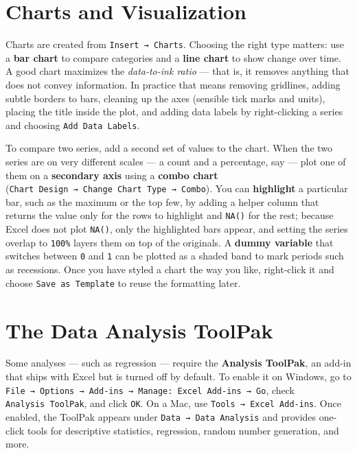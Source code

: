 \documentclass[
  11pt,
  letterpaper,
  DIV=11,
  numbers=noendperiod,
  oneside,
  open=any]{scrreprt}
\begin{document}
\section{Charts and Visualization}\label{charts-and-visualization}

Charts are created from \texttt{Insert\ →\ Charts}. Choosing the right
type matters: use a \textbf{bar chart} to compare categories and a
\textbf{line chart} to show change over time. A good chart maximizes the
\emph{data-to-ink ratio} --- that is, it removes anything that does not
convey information. In practice that means removing gridlines, adding
subtle borders to bars, cleaning up the axes (sensible tick marks and
units), placing the title inside the plot, and adding data labels by
right-clicking a series and choosing \texttt{Add\ Data\ Labels}.

To compare two series, add a second set of values to the chart. When the
two series are on very different scales --- a count and a percentage,
say --- plot one of them on a \textbf{secondary axis} using a
\textbf{combo chart}
(\texttt{Chart\ Design\ →\ Change\ Chart\ Type\ →\ Combo}). You can
\textbf{highlight} a particular bar, such as the maximum or the top few,
by adding a helper column that returns the value only for the rows to
highlight and \texttt{NA()} for the rest; because Excel does not plot
\texttt{NA()}, only the highlighted bars appear, and setting the series
overlap to \texttt{100\%} layers them on top of the originals. A
\textbf{dummy variable} that switches between \texttt{0} and \texttt{1}
can be plotted as a shaded band to mark periods such as recessions. Once
you have styled a chart the way you like, right-click it and choose
\texttt{Save\ as\ Template} to reuse the formatting later.

\section{The Data Analysis ToolPak}\label{the-data-analysis-toolpak}

Some analyses --- such as regression --- require the \textbf{Analysis
ToolPak}, an add-in that ships with Excel but is turned off by default.
To enable it on Windows, go to
\texttt{File\ →\ Options\ →\ Add-ins\ →\ Manage:\ Excel\ Add-ins\ →\ Go},
check \texttt{Analysis\ ToolPak}, and click \texttt{OK}. On a Mac, use
\texttt{Tools\ →\ Excel\ Add-ins}. Once enabled, the ToolPak appears
under \texttt{Data\ →\ Data\ Analysis} and provides one-click tools for
descriptive statistics, regression, random number generation, and more.
\end{document}
